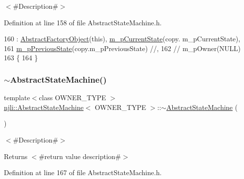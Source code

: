 $<$\#\+Description\#$>$ 

Definition at line 158 of file Abstract\+State\+Machine.\+h.


\begin{DoxyCode}
160       : \mbox{\hyperlink{classnjli_1_1_abstract_factory_object_a4f7ae7bf09c7c9426e7d6023f7fd8dec}{AbstractFactoryObject}}(\textcolor{keyword}{this}), \mbox{\hyperlink{classnjli_1_1_abstract_state_machine_ae82332bd955b01fa48471ec0613e8207}{m\_pCurrentState}}(copy.
      m\_pCurrentState),
161         \mbox{\hyperlink{classnjli_1_1_abstract_state_machine_a43a2c2c7a36aba24176e5d6d82ab9f45}{m\_pPreviousState}}(copy.m\_pPreviousState) \textcolor{comment}{//,}
162   \textcolor{comment}{//    m\_pOwner(NULL)}
163   \{
164   \}
\end{DoxyCode}
\mbox{\label{classnjli_1_1_abstract_state_machine_af05bef63fdcbaedd01df2657fe9b1e7b}} 
\subsubsection{\texorpdfstring{$\sim$\+Abstract\+State\+Machine()}{~AbstractStateMachine()}}
{\footnotesize\ttfamily template$<$class O\+W\+N\+E\+R\+\_\+\+T\+Y\+PE $>$ \\
\mbox{\hyperlink{classnjli_1_1_abstract_state_machine}{njli\+::\+Abstract\+State\+Machine}}$<$ O\+W\+N\+E\+R\+\_\+\+T\+Y\+PE $>$\+::$\sim$\mbox{\hyperlink{classnjli_1_1_abstract_state_machine}{Abstract\+State\+Machine}} (\begin{DoxyParamCaption}{ }\end{DoxyParamCaption})\hspace{0.3cm}{\ttfamily [virtual]}}

$<$\#\+Description\#$>$

\begin{DoxyReturn}{Returns}
$<$\#return value description\#$>$ 
\end{DoxyReturn}


Definition at line 167 of file Abstract\+State\+Machine.\+h.


